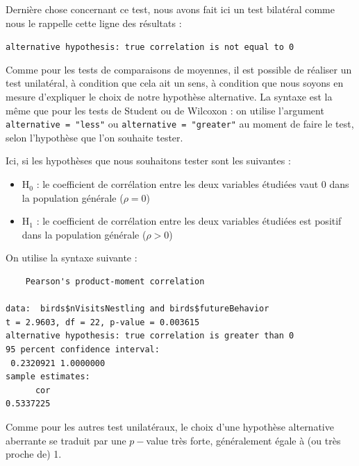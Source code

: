 \documentclass[
  a4paper,
]{article}
\newenvironment{Shaded}{\begin{snugshade}}{\end{snugshade}}
\newcommand{\AttributeTok}[1]{\textcolor[rgb]{0.00,0.34,0.68}{#1}}
\newcommand{\FunctionTok}[1]{\textcolor[rgb]{0.39,0.29,0.61}{#1}}
\newcommand{\NormalTok}[1]{\textcolor[rgb]{0.12,0.11,0.11}{#1}}
\newcommand{\SpecialCharTok}[1]{\textcolor[rgb]{0.24,0.68,0.91}{#1}}
\newcommand{\StringTok}[1]{\textcolor[rgb]{0.75,0.01,0.01}{#1}}
\providecommand{\tightlist}{%
  \setlength{\itemsep}{0pt}\setlength{\parskip}{0pt}}
\begin{document}
Dernière chose concernant ce test, nous avons fait ici un test bilatéral comme nous le rappelle cette ligne des résultats :

\texttt{alternative\ hypothesis:\ true\ correlation\ is\ not\ equal\ to\ 0}

Comme pour les tests de comparaisons de moyennes, il est possible de réaliser un test unilatéral, à condition que cela ait un sens, à condition que nous soyons en mesure d'expliquer le choix de notre hypothèse alternative. La syntaxe est la même que pour les tests de Student ou de Wilcoxon : on utilise l'argument \texttt{alternative\ =\ "less"} ou \texttt{alternative\ =\ "greater"} au moment de faire le test, selon l'hypothèse que l'on souhaite tester.

Ici, si les hypothèses que nous souhaitons tester sont les suivantes :

\begin{itemize}
\tightlist
\item
  H\(_0\) : le coefficient de corrélation entre les deux variables étudiées vaut 0 dans la population générale (\(\rho = 0\))
\item
  H\(_1\) : le coefficient de corrélation entre les deux variables étudiées est positif dans la population générale (\(\rho > 0\))
\end{itemize}

On utilise la syntaxe suivante :

\begin{Shaded}
\end{Shaded}

\begin{verbatim}
    Pearson's product-moment correlation

data:  birds$nVisitsNestling and birds$futureBehavior
t = 2.9603, df = 22, p-value = 0.003615
alternative hypothesis: true correlation is greater than 0
95 percent confidence interval:
 0.2320921 1.0000000
sample estimates:
      cor 
0.5337225 
\end{verbatim}

Comme pour les autres test unilatéraux, le choix d'une hypothèse alternative aberrante se traduit par une \(p-\)value très forte, généralement égale à (ou très proche de) 1.
\end{document}
